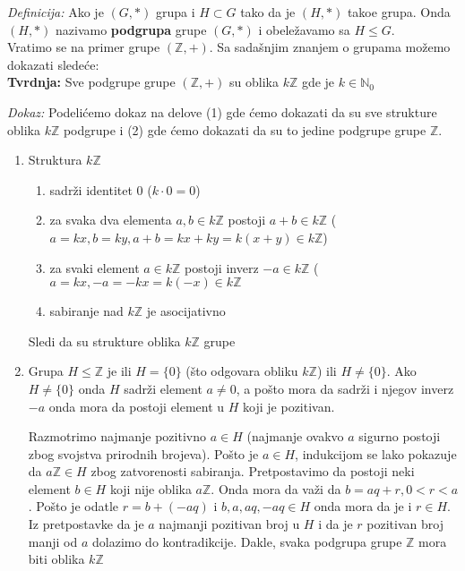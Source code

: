 \documentclass{article}
\begin{document}
\textit{Definicija:} Ako je $(G, *)$ grupa i $H \subset G$ tako da je $(H, *)$ tako\dj e grupa. Onda $(H, *)$ nazivamo \textbf{podgrupa} grupe $(G, *)$ i obeležavamo sa $H \leq G$.\\

Vratimo se na primer grupe $(\mathbb{Z}, +)$. Sa sadašnjim znanjem o grupama možemo dokazati sledeće: \\

\textbf{Tvrdnja:} Sve podgrupe grupe $(\mathbb{Z}, +)$ su oblika $k\mathbb{Z}$ gde je $k \in \mathbb{N}_0$

\textit{Dokaz:} Podelićemo dokaz na delove (1) gde ćemo dokazati da su sve strukture oblika $k\mathbb{Z}$ podgrupe i (2) gde ćemo dokazati da su to jedine podgrupe grupe $\mathbb{Z}$.

\begin{enumerate}
    \item Struktura $k\mathbb{Z}$
    \begin{enumerate}
        \item sadrži identitet 0 ($k \cdot 0 = 0$)
        \item za svaka dva elementa $a, b \in k\mathbb{Z}$ postoji $a + b \in k\mathbb{Z}$ ($a = kx, b = ky, a+b = kx + ky = k(x + y) \in k\mathbb{Z}$)
        \item za svaki element $a \in k\mathbb{Z}$ postoji inverz $-a \in k\mathbb{Z}$ ($a = kx, -a = -kx = k(-x) \in k\mathbb{Z}$
        \item sabiranje nad $k\mathbb{Z}$ je asocijativno
    \end{enumerate}
    Sledi da su strukture oblika $k\mathbb{Z}$ grupe
    
    \item Grupa $H \leq \mathbb{Z}$ je ili $H = \{0\}$ (što odgovara obliku $k\mathbb{Z}$) ili $H \neq \{0\}$. Ako $H \neq \{0\}$ onda $H$ sadrži element $a \neq 0$, a pošto mora da sadrži i njegov inverz $-a$ onda mora da postoji element u $H$ koji je pozitivan.
    
    Razmotrimo najmanje pozitivno $a \in H$ (najmanje ovakvo $a$ sigurno postoji zbog svojstva prirodnih brojeva). Pošto je $a \in H$, indukcijom se lako pokazuje da $a\mathbb{Z} \in H$ zbog zatvorenosti sabiranja. Pretpostavimo da postoji neki element $b \in H$ koji nije oblika $a\mathbb{Z}$. Onda mora da važi da $b = aq+r, 0 < r < a$. Pošto je odatle $r = b + (-aq)$ i $b, a, aq, -aq\in H$ onda mora da je i $r \in H$. Iz pretpostavke da je $a$ najmanji pozitivan broj u $H$ i da je $r$ pozitivan broj manji od $a$ dolazimo do kontradikcije. Dakle, svaka podgrupa grupe $\mathbb{Z}$ mora biti oblika $k\mathbb{Z}$ 
\end{enumerate}
\end{document}
